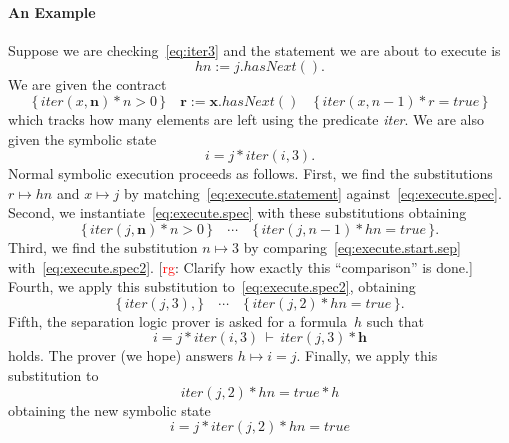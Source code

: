 \documentclass[a4paper]{article}
\newcommand{\todo}[2]{{\small [\textcolor{red}{#1}: #2]}}
\newcommand{\rg}[1]{\todo{rg}{#1}}
\theoremstyle{slanted}
\theoremstyle{definition}
\theoremstyle{remark}
\begin{document}
\paragraph{An Example}
Suppose we are checking~\eqref{eq:iter3} and the statement we are about to execute is
\begin{equation}\label{eq:execute.statement}
\mathit{hn}:=j.\mathit{hasNext}().
\end{equation}
We are given the contract
\begin{equation}\label{eq:execute.spec}
\{\,\mathit{iter}(x, \mathbf{n})*n>0\,\}
  \quad \mathbf{r} := \mathbf{x}.\mathit{hasNext}()
  \quad \{\,\mathit{iter}(x, n-1)*r=\mathit{true}\,\}
\end{equation}
which tracks how many elements are left using the predicate \textit{iter}.
We are also given the symbolic state 
\begin{equation}\label{eq:execute.start.sep}
i=j*\mathit{iter}(i,3).
\end{equation}
Normal symbolic execution proceeds as follows.
First, we find the substitutions $r\mapsto\mathit{hn}$ and $x\mapsto j$ by matching~\eqref{eq:execute.statement} against~\eqref{eq:execute.spec}.
Second, we instantiate~\eqref{eq:execute.spec} with these substitutions obtaining
\begin{equation}\label{eq:execute.spec2}
\{\,\mathit{iter}(j, \mathbf{n})*n>0\,\}
  \quad \cdots
  \quad \{\,\mathit{iter}(j, n-1)*\mathit{hn}=\mathit{true}\,\}.
\end{equation}
Third, we find the substitution $n\mapsto3$ by comparing~\eqref{eq:execute.start.sep} with~\eqref{eq:execute.spec2}.
\rg{Clarify how exactly this ``comparison'' is done.}
Fourth, we apply this substitution to~\eqref{eq:execute.spec2}, obtaining
\begin{equation}
\{\,\mathit{iter}(j, 3),\}
  \quad \cdots
  \quad \{\,\mathit{iter}(j, 2)*\mathit{hn}=\mathit{true}\,\}.
\end{equation}
Fifth, the separation logic prover is asked for a formula~$h$ such that
\begin{equation}
i=j*\mathit{iter(i,3)} \,\vdash\, \mathit{iter}(j,3) * \mathbf{h}
\end{equation}
holds.
The prover (we hope) answers $h\mapsto i=j$.
Finally, we apply this substitution to
\begin{equation}
\mathit{iter}(j,2)*\mathit{hn}=\mathit{true}*h
\end{equation}
obtaining the new symbolic state
\begin{equation}
i=j*\mathit{iter}(j,2)*\mathit{hn}=\mathit{true}
\end{equation}
\end{document}
